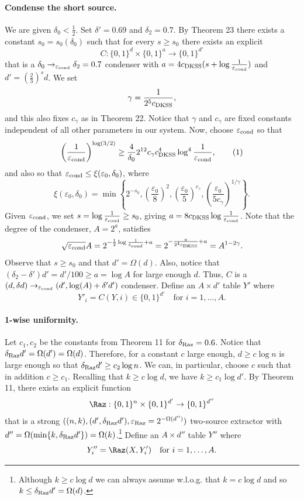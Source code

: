 \paragraph{Condense the short source.} We are given $\delta_0<\frac12$. Set $\delta'=0.69$ and $\delta_2=0.7$.
By Theorem 23 there exists a constant $s_0=s_0(\delta_0)$ such that for every $s\ge s_0$ there exists an explicit
\[C:\{0,1\}^d\times\{0,1\}^a\to\{0,1\}^{d'}\]
that is a $\delta_0\to_{\varepsilon_{\rm cond}}\delta_2=0.7$ condenser with $a=4c_{\rm DKSS}(s+\log\frac1{\varepsilon_{\rm cond}})$ and $d'=(\frac23)^sd$.
We set
\[\gamma=\frac1{2^5c_{\rm DKSS}},\]
and this also fixes $c_\gamma$ as in Theorem 22. Notice that $\gamma$ and $c_\gamma$ are fixed constants independent of all other parameters in our system.
Now, choose $\varepsilon_{\rm cond}$ so that
\begin{equation}\left(\frac1{\varepsilon_{\rm cond}}\right)^{\log(3/2)}\ge\frac4{\delta_0}2^{12}c_\gamma c_{\rm DKSS}^4\log^4\frac1{\varepsilon_{\rm cond}},\tag{1}\label{eq:cond}\end{equation}
and also so that $\varepsilon_{\rm cond}\le\xi(\varepsilon_0,\delta_0)$, where
\begin{equation}\xi(\varepsilon_0,\delta_0)=\min\left\{2^{-s_0},\left(\frac{\varepsilon_0}8\right)^2,\left(\frac{\varepsilon_0}5\right)^{c_\gamma},\left(\frac{\varepsilon_0}{5c_\gamma}\right)^{1/\gamma}\right\}.\tag{2}\label{eq:xi}\end{equation}
Given $\varepsilon_{\rm cond}$, we set $s=\log\frac1{\varepsilon_{\rm cond}}\ge s_0$, giving $a=8c_{\rm DKSS}\log\frac1{\varepsilon_{\rm cond}}$. Note that the degree of the condenser, $A=2^a$, satisfies
\[\sqrt{\varepsilon_{\rm cond}}A=2^{-\frac12\log\frac1{\varepsilon_{\rm cond}}+a}=2^{-\frac a{2^4c_{\rm DKSS}}+a}=A^{1-2\gamma}.\]
Observe that $s\ge s_0$ and that $d'=\Omega(d)$. Also, notice that $(\delta_2-\delta')d'=d'/100\ge a=\log A$ for large enough $d$. Thus, $C$ is a $(d,\delta d)\to_{\varepsilon_{\rm cond}}(d',\log(A)+\delta'd')$ condenser.
Define an $A\times d'$ table $Y'$ where
\[Y'_i=C(Y,i)\in\{0,1\}^{d'}\quad\text{for }i=1,\ldots,A.\]
\paragraph{1-wise uniformity.} Let $c_1,c_2$ be the constants from Theorem 11 for $\delta_{\rm Raz}=0.6$.
Notice that $\delta_{\rm Raz}d'=\Omega(d')=\Omega(d)$. Therefore, for a constant $c$ large enough, $d\ge c\log n$ is large enough so that $\delta_{\rm Raz}d'\ge c_2\log n$. We can, in particular, choose $c$ such that in addition $c\ge c_1$. Recalling that $k\ge c\log d$, we have $k\ge c_1\log d'$. By Theorem 11, there exists an explicit function
\[\Raz:\{0,1\}^n\times\{0,1\}^{d'}\to\{0,1\}^{d''}\]
that is a strong $((n,k),(d',\delta_{\rm Raz}d'),\varepsilon_{\rm Raz}=2^{-\Omega(d'')})$ two-source extractor with $d''=\Omega(\min\{k,\delta_{\rm Raz}d'\})=\Omega(k)$.\footnote{Although $k\ge c\log d$ we can always assume w.l.o.g. that $k=c\log d$ and so $k\le\delta_{\rm Raz}d'=\Omega(d)$.} Define an $A\times d''$ table $Y''$ where
\[Y''_i=\Raz(X,Y'_i)\quad\text{for }i=1,\ldots,A.\]
